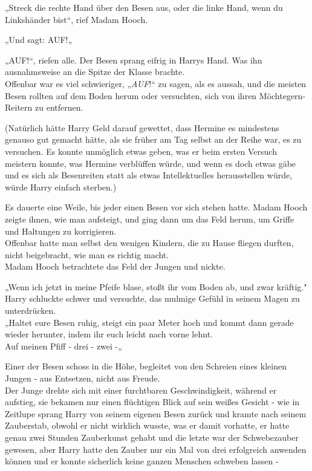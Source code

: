 {„Streck die rechte Hand über den Besen aus, oder die linke Hand, wenn du Linkshänder bist“, rief Madam Hooch.

„Und sagt: AUF!„

„AUF!“, riefen alle. Der Besen sprang eifrig in Harrys Hand. Was ihn ausnahmsweise an die Spitze der Klasse brachte.\\ Offenbar war es viel schwieriger, „\emph{AUF}!“ zu sagen, als es aussah, und die meisten Besen rollten auf dem Boden herum oder versuchten, sich von ihren Möchtegern-Reitern zu entfernen.

(Natürlich hätte Harry Geld darauf gewettet, dass Hermine es mindestens genauso gut gemacht hätte, als sie früher am Tag selbst an der Reihe war, es zu versuchen. Es konnte unmöglich etwas geben, was er beim ersten Versuch meistern konnte, was Hermine verblüffen würde, und wenn es doch etwas gäbe und es sich als Besenreiten statt als etwas Intellektuelles herausstellen würde, würde Harry einfach sterben.)

Es dauerte eine Weile, bis jeder einen Besen vor sich stehen hatte. Madam Hooch zeigte ihnen, wie man aufsteigt, und ging dann um das Feld herum, um Griffe und Haltungen zu korrigieren.\\ Offenbar hatte man selbst den wenigen Kindern, die zu Hause fliegen durften, nicht beigebracht, wie man es richtig macht.\\ Madam Hooch betrachtete das Feld der Jungen und nickte.

„Wenn ich jetzt in meine Pfeife blase, stoßt ihr vom Boden ab, und zwar kräftig."\\ Harry schluckte schwer und versuchte, das mulmige Gefühl in seinem Magen zu unterdrücken.\\ „Haltet eure Besen ruhig, steigt ein paar Meter hoch und kommt dann gerade wieder herunter, indem ihr euch leicht nach vorne lehnt.\\ Auf meinen Pfiff - drei - zwei -„

Einer der Besen schoss in die Höhe, begleitet von den Schreien eines kleinen Jungen - aus Entsetzen, nicht aus Freude.\\ Der Junge drehte sich mit einer furchtbaren Geschwindigkeit, während er aufstieg, sie bekamen nur einen flüchtigen Blick auf sein weißes Gesicht - wie in Zeitlupe sprang Harry von seinem eigenen Besen zurück und kramte nach seinem Zauberstab, obwohl er nicht wirklich wusste, was er damit vorhatte, er hatte genau zwei Stunden Zauberkunst gehabt und die letzte war der Schwebezauber gewesen, aber Harry hatte den Zauber nur ein Mal von drei erfolgreich anwenden können und er konnte sicherlich keine ganzen Menschen schweben lassen -

}
